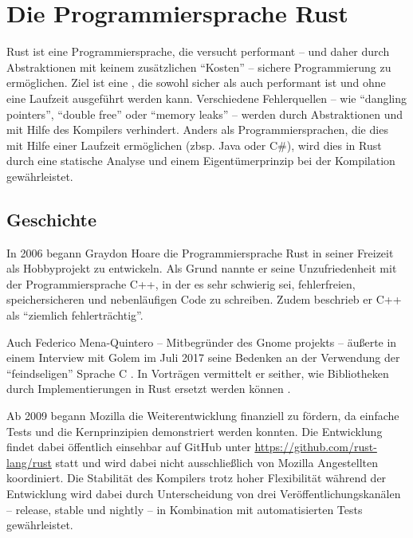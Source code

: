 
\chapter{Die Programmiersprache Rust}

Rust ist eine Programmiersprache, die versucht performant -- und daher durch Abstraktionen mit keinem zusätzlichen \enquote{Kosten}  -- sichere Programmierung zu ermöglichen.
Ziel ist eine , die sowohl sicher  als auch performant ist und ohne eine Laufzeit ausgeführt werden kann.
Verschiedene Fehlerquellen -- wie \enquote{dangling pointers}, \enquote{double free} oder \enquote{memory leaks}  --  werden durch Abstraktionen und mit Hilfe des Kompilers verhindert.
Anders als Programmiersprachen, die dies mit Hilfe einer Laufzeit ermöglichen (zbsp. Java oder C\#), wird dies in Rust durch eine statische Analyse und einem Eigentümerprinzip bei der Kompilation gewährleistet.


\section{Geschichte}
\label{rust:history}

In 2006 \cite{rust:faq} begann Graydon Hoare die Programmiersprache Rust in seiner Freizeit als Hobbyprojekt zu entwickeln.
Als Grund nannte er seine Unzufriedenheit mit der Programmiersprache C++, in der es sehr schwierig sei, fehlerfreien, speichersicheren und nebenläufigen Code zu schreiben.
Zudem beschrieb er C++ als \enquote{ziemlich fehlerträchtig}. \cite{rust:heise_interview_graydon}

Auch Federico Mena-Quintero -- Mitbegründer des Gnome projekts  --
äußerte in einem Interview mit Golem im Juli 2017 seine Bedenken an der Verwendung der \enquote{feindseligen} Sprache C \cite{rust:c_is_hostile_golem}.
In Vorträgen  vermittelt er seither, wie Bibliotheken durch Implementierungen in Rust ersetzt werden können \cite{rust:c_is_hostile_mena}.

Ab 2009 begann Mozilla die Weiterentwicklung finanziell zu fördern, da einfache Tests und die Kernprinzipien demonstriert werden konnten.
Die Entwicklung findet dabei öffentlich einsehbar auf GitHub unter \url{https://github.com/rust-lang/rust} statt und wird dabei nicht ausschließlich von Mozilla Angestellten koordiniert.
Die Stabilität des Kompilers trotz hoher Flexibilität während der Entwicklung wird dabei durch Unterscheidung von drei Veröffentlichungskanälen -- release, stable und nightly -- in Kombination mit automatisierten Tests  gewährleistet. \cite{rust:faq}



